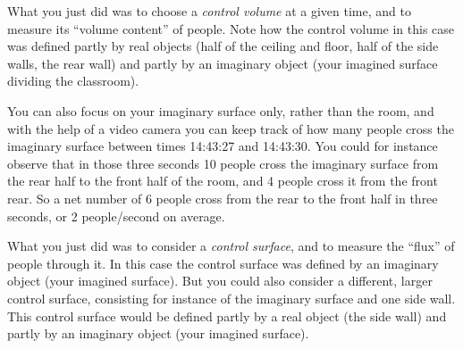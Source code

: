\documentclass[a4paper,12pt,%
onecolumn,oneside,%
british%
]{memoir}
\renewcommand*{\|}[1][]{\nonscript\:#1\vert\nonscript\:\mathopen{}}
\begin{document}
What you just did was to choose a \emph{control volume} at a given time, and to measure its \enquote{volume content} of people. Note how the control volume in this case was defined partly by real objects (half of the ceiling and floor, half of the side walls, the rear wall) and partly by an imaginary object (your imagined surface dividing the classroom).

\medskip

You can also focus on your imaginary surface only, rather than the room, and with the help of a video camera you can keep track of how many people cross the imaginary surface between times 14:43:27 and 14:43:30. You could for instance observe that in those three seconds 10 people cross the imaginary surface from the rear half to the front half of the room, and 4 people cross it from the front rear. So a net number of 6 people cross from the rear to the front half in three seconds, or 2 people/second on average.

What you just did was to consider a \emph{control surface}, and to measure the \enquote{flux} of people through it. In this case the control surface was defined by an imaginary object (your imagined surface). But you could also consider a different, larger control surface, consisting for instance of the imaginary surface and one side wall. This control surface would be defined partly by a real object (the side wall) and partly by an imaginary object (your imagined surface).


\medskip
\end{document}
